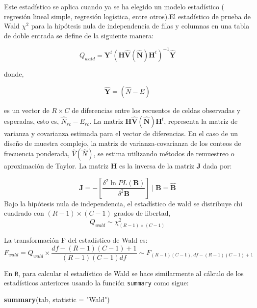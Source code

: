 \documentclass[
  spanish,
  12pt,
]{book}
\newenvironment{Shaded}{\begin{snugshade}}{\end{snugshade}}
\newcommand{\AttributeTok}[1]{\textcolor[rgb]{0.13,0.29,0.53}{#1}}
\newcommand{\FunctionTok}[1]{\textcolor[rgb]{0.13,0.29,0.53}{\textbf{#1}}}
\newcommand{\NormalTok}[1]{#1}
\newcommand{\StringTok}[1]{\textcolor[rgb]{0.31,0.60,0.02}{#1}}
\begin{document}
Este estadístico se aplica cuando ya se ha elegido un modelo estadístico ( regresión lineal simple, regresión logística, entre otros).El estadístico de prueba de Wald \(\chi^{2}\) para la hipótesis nula de independencia de filas y columnas en una tabla de doble entrada se define de la siguiente manera:

\[
Q_{wald}=\hat{\boldsymbol{Y}^{t}}\left(\boldsymbol{H}\hat{\boldsymbol{V}}\left(\hat{\boldsymbol{N}}\right)\boldsymbol{H}^{t}\right)^{-1}\hat{\boldsymbol{Y}}
\]

donde,

\[
\hat{\boldsymbol{Y}}=\left(\hat{N}-E\right)
\]

es un vector de \(R\times C\) de diferencias entre los recuentos de celdas observadas y esperadas, esto es, \(\hat{N}_{rc}-E_{rc}\). La matriz \(\boldsymbol{H}\hat{\boldsymbol{V}}\left(\hat{\boldsymbol{N}}\right)\boldsymbol{H}^{t}\), representa la matriz de varianza y covarianza estimada para el vector de diferencias. En el caso de un diseño de muestra complejo, la matriz de varianza-covarianza de los conteos de frecuencia ponderada, \(\hat{V}\left(\hat{N}\right)\), se estima utilizando métodos de remuestreo o aproximación de Taylor. La matriz \(\boldsymbol{H}\) es la inversa de la matriz \(\boldsymbol{J}\) dada por:

\[
\boldsymbol{J}=-\left[\frac{\delta^{2}\ln PL\left(\boldsymbol{B}\right)}{\delta^{2}\boldsymbol{B}}\right] \mid \boldsymbol{B}=\hat{\boldsymbol{B}}
\]
Bajo la hipótesis nula de independencia, el estadístico de wald se distribuye chi cuadrado con \(\left(R-1\right)\times\left(C-1\right)\) grados de libertad,
\[
Q_{wald}\sim\chi_{\left(R-1\right)\times\left(C-1\right)}^{2}
\]

La transformación F del estadístico de Wald es:
\[
F_{wald}=Q_{wald}\times\frac{df-\left(R-1\right)\left(C-1\right)+1}{\left(R-1\right)\left(C-1\right)df}\sim F_{\left(R-1\right)\left(C-1\right),df-\left(R-1\right)\left(C-1\right)+1}
\]

En \texttt{R}, para calcular el estadístico de Wald se hace similarmente al cálculo de los estadísticos anteriores usando la función \texttt{summary} como sigue:

\begin{Shaded}
\begin{Highlighting}[]
\FunctionTok{summary}\NormalTok{(tab, }\AttributeTok{statistic =} \StringTok{"Wald"}\NormalTok{)}
\end{Highlighting}
\end{Shaded}
\end{document}
